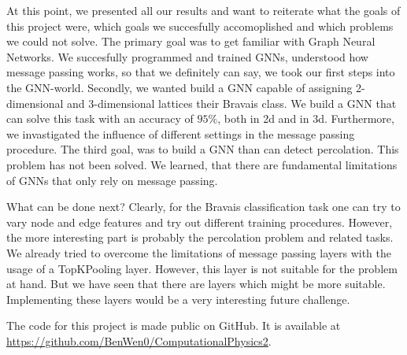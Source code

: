 At this point, we presented all our results and want to reiterate what the 
goals of this project were, which goals we succesfully accomoplished and which 
problems we could not solve.
The primary goal was to get familiar with Graph Neural Networks. 
We succesfully programmed and trained GNNs, understood how message passing works, so that we definitely can say, we took our 
first steps into the GNN-world. Secondly, we wanted build a GNN capable of assigning 2-dimensional and
3-dimensional lattices their Bravais class. We build a GNN that can solve this task with an accuracy of $95\%$, both in 2d and in 3d.
Furthermore, we invastigated the influence of different settings in the message passing procedure. 
The third goal, was to build a GNN than can detect percolation. This problem has not been solved.
We learned, that there are fundamental limitations of GNNs that only rely on message passing.

What can be done next? 
Clearly, for the Bravais classification task one can try to vary node and edge features and try out different training procedures.
However, the more interesting part is probably the percolation problem and related tasks. We already tried to overcome the
limitations of message passing layers with the usage of a TopKPooling layer. However, this layer is not suitable
for the problem at hand. But we have seen that there are layers which might be more suitable. 
Implementing these layers would be a very interesting future challenge.

The code for this project is made public on GitHub. 
It is available at \url{https://github.com/BenWen0/ComputationalPhysics2}.
